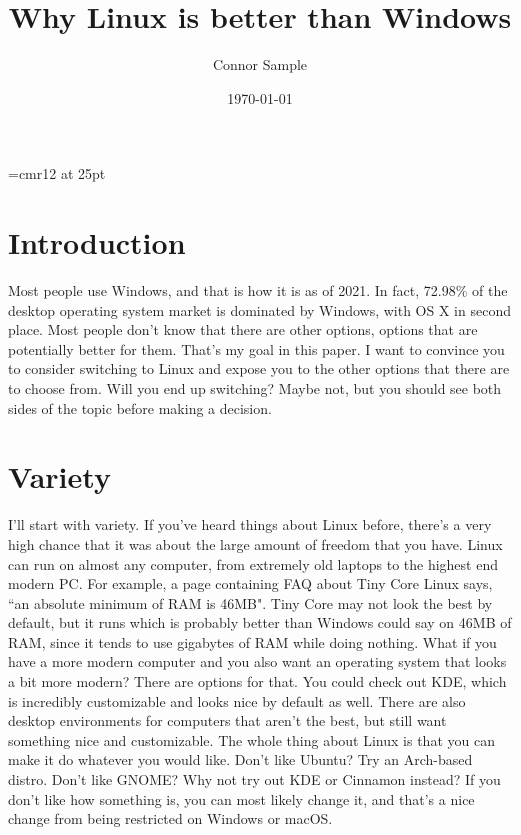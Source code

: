 \documentclass[12pt]{article}
\begin{document}
	\tableofcontents{}

	\font\bighdr=cmr12 at 25pt
	\title{{\bighdr Why Linux is better than Windows}}
	\author{Connor Sample}
	\date {\today}
	\maketitle\thispagestyle{fancy}

	\section{Introduction}

	Most people use Windows, and that is how it is as of 2021. In fact, 72.98\%  of the desktop operating system market is dominated by Windows, with OS X in second place. \cite{market_share:0} Most people don't know that there are other options, options that are potentially better for them. That's my goal in this paper. I want to convince you to consider switching to Linux and expose you to the other options that there are to choose from. Will you end up switching? Maybe not, but you should see both sides of the topic before making a decision.

	\section{Variety}

	I'll start with variety. If you've heard things about Linux before, there's a very high chance that it was about the large amount of freedom that you have. Linux can run on almost any computer, from extremely old laptops to the highest end modern PC. For example, a page containing FAQ about Tiny Core Linux says, ``an absolute minimum of RAM is 46MB". \cite{tiny_core:0} Tiny Core may not look the best by default, but it runs which is probably better than Windows could say on 46MB of RAM, since it tends to use gigabytes of RAM while doing nothing. What if you have a more modern computer and you also want an operating system that looks a bit more modern? There are options for that. You could check out KDE, which is incredibly customizable and looks nice by default as well. There are also desktop environments for computers that aren't the best, but still want something nice and customizable. The whole thing about Linux is that you can make it do whatever you would like. Don't like Ubuntu? Try an Arch-based distro. Don't like GNOME? Why not try out KDE or Cinnamon instead? If you don't like how something is, you can most likely change it, and that's a nice change from being restricted on Windows or macOS.
\end{document}
